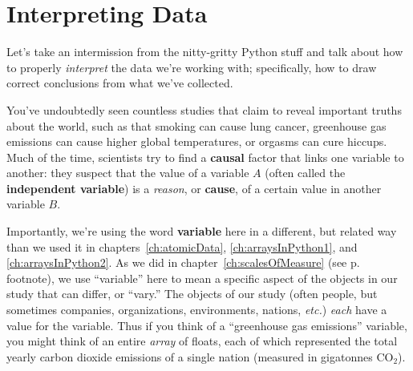 
\chapter{Interpreting Data}

Let's take an intermission from the nitty-gritty Python stuff and talk about
how to properly \textit{interpret} the data we're working with; specifically,
how to draw correct conclusions from what we've collected.

You've undoubtedly seen countless studies that claim to reveal important truths
about the world, such as that smoking can cause lung cancer, greenhouse gas
emissions can cause higher global temperatures, or orgasms can cure hiccups.
Much of the time, scientists try to find a \textbf{causal} factor that links
one variable to another: they suspect that the value of a variable $A$ (often
called the \textbf{independent variable}) is a \textit{reason}, or
\textbf{cause}, of a certain value in another variable $B$.


Importantly, we're using the word \textbf{variable} here in a different, but
related way than we used it in chapters~\ref{ch:atomicData},
\ref{ch:arraysInPython1}, and \ref{ch:arraysInPython2}. As we did in
chapter~\ref{ch:scalesOfMeasure} (see p.~\pageref{variableDifferent} footnote),
we use ``variable'' here to mean a specific aspect of the objects in our study
that can differ, or ``vary.'' The objects of our study (often people, but
sometimes companies, organizations, environments, nations, \textit{etc.})
\textit{each} have a value for the variable. Thus if you think of a
``greenhouse gas emissions'' variable, you might think of an entire
\textit{array} of floats, each of which represented the total yearly carbon
dioxide emissions of a single nation (measured in gigatonnes $\textrm{CO}_2$).



